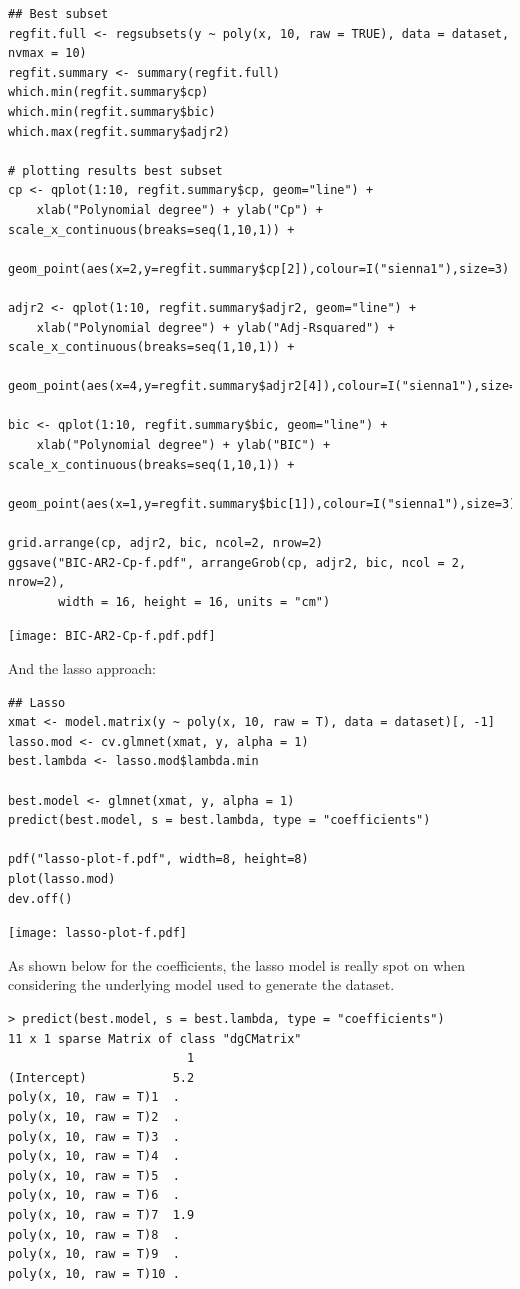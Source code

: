 \documentclass[11pt, a4paper]{article}
\begin{document}
\begin{verbatim}
## Best subset
regfit.full <- regsubsets(y ~ poly(x, 10, raw = TRUE), data = dataset, nvmax = 10)
regfit.summary <- summary(regfit.full)
which.min(regfit.summary$cp)
which.min(regfit.summary$bic)
which.max(regfit.summary$adjr2)

# plotting results best subset
cp <- qplot(1:10, regfit.summary$cp, geom="line") +
    xlab("Polynomial degree") + ylab("Cp") + scale_x_continuous(breaks=seq(1,10,1)) +
    geom_point(aes(x=2,y=regfit.summary$cp[2]),colour=I("sienna1"),size=3)

adjr2 <- qplot(1:10, regfit.summary$adjr2, geom="line") +
    xlab("Polynomial degree") + ylab("Adj-Rsquared") + scale_x_continuous(breaks=seq(1,10,1)) +
    geom_point(aes(x=4,y=regfit.summary$adjr2[4]),colour=I("sienna1"),size=3)

bic <- qplot(1:10, regfit.summary$bic, geom="line") +
    xlab("Polynomial degree") + ylab("BIC") + scale_x_continuous(breaks=seq(1,10,1)) +
    geom_point(aes(x=1,y=regfit.summary$bic[1]),colour=I("sienna1"),size=3)

grid.arrange(cp, adjr2, bic, ncol=2, nrow=2)
ggsave("BIC-AR2-Cp-f.pdf", arrangeGrob(cp, adjr2, bic, ncol = 2, nrow=2),
       width = 16, height = 16, units = "cm")
\end{verbatim}

\texttt{[image: BIC-AR2-Cp-f.pdf.pdf]}

And the lasso approach:


\begin{verbatim}
## Lasso
xmat <- model.matrix(y ~ poly(x, 10, raw = T), data = dataset)[, -1]
lasso.mod <- cv.glmnet(xmat, y, alpha = 1)
best.lambda <- lasso.mod$lambda.min

best.model <- glmnet(xmat, y, alpha = 1)
predict(best.model, s = best.lambda, type = "coefficients")

pdf("lasso-plot-f.pdf", width=8, height=8)
plot(lasso.mod)
dev.off()
\end{verbatim}

\texttt{[image: lasso-plot-f.pdf]}

As shown below for the coefficients, the lasso model is really spot on
when considering the underlying model used to generate the dataset.

\begin{verbatim}
> predict(best.model, s = best.lambda, type = "coefficients")
11 x 1 sparse Matrix of class "dgCMatrix"
                         1
(Intercept)            5.2
poly(x, 10, raw = T)1  .  
poly(x, 10, raw = T)2  .  
poly(x, 10, raw = T)3  .  
poly(x, 10, raw = T)4  .  
poly(x, 10, raw = T)5  .  
poly(x, 10, raw = T)6  .  
poly(x, 10, raw = T)7  1.9
poly(x, 10, raw = T)8  .  
poly(x, 10, raw = T)9  .  
poly(x, 10, raw = T)10 .
\end{verbatim}
\end{document}
